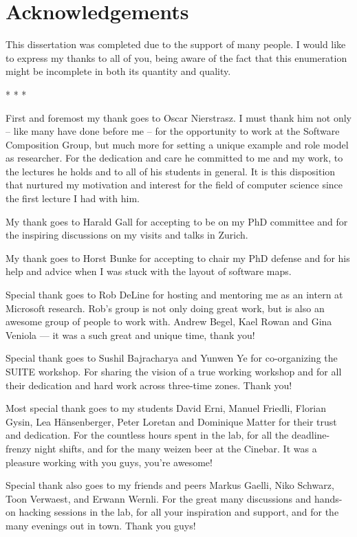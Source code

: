 \chapter*{Acknowledgements}

This dissertation was completed due to the support of many people.
I would like to express my thanks to all of you, being aware of the fact that this enumeration might be incomplete in both its quantity and quality.

\begin{center}* * *\end{center}

First and foremost my thank goes to Oscar Nierstrasz. 
%
I must thank him not only -- like many have done before me -- for the opportunity to work at the Software Composition Group, but much more for setting a unique example and role model as researcher. For the dedication and care he committed to me and my 
work, to the lectures he holds and to all of his students in general. It is this disposition that 
nurtured my motivation and interest for the field of computer science since the first lecture 
I had with him. 

My thank goes to Harald Gall for accepting to be on my PhD committee and for the inspiring discussions on my visits and talks in Zurich. 

My thank goes to Horst Bunke for accepting to chair my PhD defense and for his help and advice when I was stuck with the layout of software maps.

Special thank goes to Rob DeLine for hosting and mentoring me as an intern at Microsoft research. Rob's group is not only doing great work, but is also an awesome group of people to work with. Andrew Begel, Kael Rowan and Gina Veniola --- it was a such great and unique time, thank you!

Special thank goes to Sushil Bajracharya and Yunwen Ye for co-organizing the SUITE workshop. For sharing the vision of a true working workshop and for all their dedication and hard work across three-time zones. Thank you!

Most special thank goes to my students David Erni, Manuel Friedli, Florian Gysin, Lea H\"ansenberger, Peter Loretan and Dominique Matter for their trust and dedication. For the countless hours spent in the lab, for all the deadline-frenzy night shifts, and for the many weizen beer at the Cinebar. It was a pleasure working with you guys, you're awesome!

Special thank also goes to my friends and peers Markus Gaelli, Niko Schwarz, Toon Verwaest, and Erwann Wernli. For the great many discussions and hands-on hacking sessions in the lab, for all your inspiration and support, and for the many evenings out in town.  Thank you guys!

